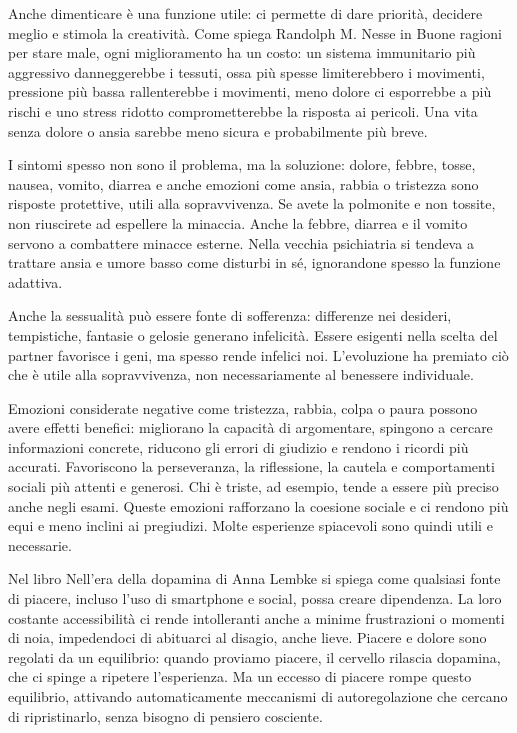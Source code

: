 \documentclass[12pt]{book} %
\begin{document}
\begin{mdframed}[linewidth=1pt]
Anche dimenticare è una funzione utile: ci permette di dare priorità, decidere meglio e stimola la creatività. Come spiega Randolph M. Nesse in Buone ragioni per stare male, ogni miglioramento ha un costo: un sistema immunitario più aggressivo danneggerebbe i tessuti, ossa più spesse limiterebbero i movimenti, pressione più bassa rallenterebbe i movimenti, meno dolore ci esporrebbe a più rischi e uno stress ridotto comprometterebbe la risposta ai pericoli. Una vita senza dolore o ansia sarebbe meno sicura e probabilmente più breve.

I sintomi spesso non sono il problema, ma la soluzione: dolore, febbre, tosse, nausea, vomito, diarrea e anche emozioni come ansia, rabbia o tristezza sono risposte protettive, utili alla sopravvivenza. Se avete la polmonite e non tossite, non riuscirete ad espellere la minaccia. Anche la febbre, diarrea e il vomito servono a combattere minacce esterne. Nella vecchia psichiatria si tendeva a trattare ansia e umore basso come disturbi in sé, ignorandone spesso la funzione adattiva.

Anche la sessualità può essere fonte di sofferenza: differenze nei desideri, tempistiche, fantasie o gelosie generano infelicità. Essere esigenti nella scelta del partner favorisce i geni, ma spesso rende infelici noi. L’evoluzione ha premiato ciò che è utile alla sopravvivenza, non necessariamente al benessere individuale.

Emozioni considerate negative come tristezza, rabbia, colpa o paura possono avere effetti benefici: migliorano la capacità di argomentare, spingono a cercare informazioni concrete, riducono gli errori di giudizio e rendono i ricordi più accurati. Favoriscono la perseveranza, la riflessione, la cautela e comportamenti sociali più attenti e generosi. Chi è triste, ad esempio, tende a essere più preciso anche negli esami. Queste emozioni rafforzano la coesione sociale e ci rendono più equi e meno inclini ai pregiudizi. Molte esperienze spiacevoli sono quindi utili e necessarie.

Nel libro Nell'era della dopamina di Anna Lembke si spiega come qualsiasi fonte di piacere, incluso l’uso di smartphone e social, possa creare dipendenza. La loro costante accessibilità ci rende intolleranti anche a minime frustrazioni o momenti di noia, impedendoci di abituarci al disagio, anche lieve. Piacere e dolore sono regolati da un equilibrio: quando proviamo piacere, il cervello rilascia dopamina, che ci spinge a ripetere l’esperienza. Ma un eccesso di piacere rompe questo equilibrio, attivando automaticamente meccanismi di autoregolazione che cercano di ripristinarlo, senza bisogno di pensiero cosciente.


\end{mdframed}
\end{document}
